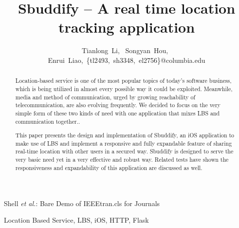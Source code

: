 \documentclass[journal]{IEEEtran}
\begin{document}
\title{Sbuddify -- A real time location tracking application}
\author{Tianlong~Li,~
        Songyan~Hou,~
        Enrui~Liao,~\{tl2493,~sh3348,~el2756\}@columbia.edu}





%
{Shell \MakeLowercase{\textit{et al.}}: Bare Demo of IEEEtran.cls for Journals}


\maketitle


\begin{abstract}
Location-based service is one of the most popular topics of today's software business, which is being utilized in almost every possible way it could be exploited. Meanwhile, media and method of communication, urged by growing reachability of telecommunication, are also evolving frequently. We decided to focus on the very simple form of these two kinds of need with one application that mixes LBS and communication together..

This paper presents the design and implementation of Sbuddify, an iOS application to make use of LBS and implement a responsive and fully expandable feature of sharing real-time location with other users in a secured way. Sbuddify is designed to serve the very basic need yet in a very effective and robust way. Related tests have shown the responsiveness and expandability of this application are discussed as well.

\end{abstract}

\begin{IEEEkeywords}
Location Based Service, LBS, iOS, HTTP, Flask
\end{IEEEkeywords}






%
\IEEEpeerreviewmaketitle
\end{document}
